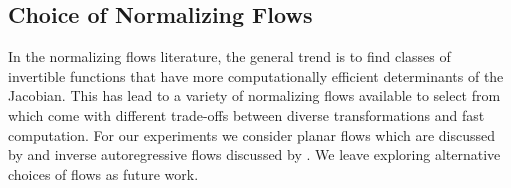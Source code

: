 
\subsection{Choice of Normalizing Flows}
In the normalizing flows literature, the general trend is to find classes of invertible functions that have more computationally efficient determinants of the Jacobian. This has lead to a variety of normalizing flows available to select from which come with different trade-offs between diverse transformations and fast computation. For our experiments we consider planar flows which are discussed by \citet{rezende2015VIwithNF} and inverse autoregressive flows discussed by \citet{kingma2016IAF}. We leave exploring alternative choices of flows as future work.




